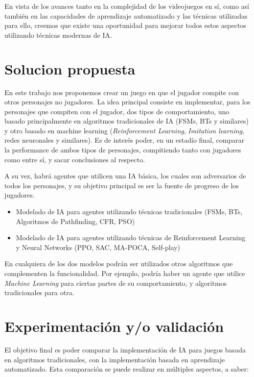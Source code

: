 \documentclass[a4paper]{article}
\begin{document}
En vista de los avances tanto en la complejidad de los videojuegos en sí, como así también en las capacidades de aprendizaje automatizado y las técnicas utilizadas para ello, creemos que existe una oportunidad para mejorar todos estos aspectos utilizando técnicas modernas de IA.

\section{Solucion propuesta}

En este trabajo nos proponemos crear un juego en que el jugador compite con otros personajes no jugadores. La idea principal consiste en implementar, para los personajes que compiten con el jugador, dos tipos de comportamiento, uno basado principalmente en algoritmos tradicionales de IA (FSMs, BTs y similares) y otro basado en machine learning (\textit{Reinforcement Learning}, \textit{Imitation learning}, redes neuronales y similares). Es de interés poder, en un estadío final, comparar la performance de ambos tipos de personajes, compitiendo tanto con jugadores como entre sí, y sacar conclusiones al respecto.

A su vez, habrá agentes que utilicen una IA básica, los cuales son adversarios de todos los personajes, y su objetivo principal es ser la fuente de progreso de los jugadores.

\begin{itemize}
    \item Modelado de IA para agentes utilizando técnicas tradicionales (FSMs, BTs, Algoritmos de Pathfinding, CFR, PSO)
    \item Modelado de IA para agentes utilizando técnicas de Reinforcement Learning y Neural Networks (PPO, SAC, MA-POCA, Self-play)
\end{itemize}

En cualquiera de los dos modelos podrán ser utilizados otros algoritmos que complementen la funcionalidad. Por ejemplo, podría haber un agente que utilice \textit{Machine Learning} para ciertas partes de su comportamiento, y algoritmos tradicionales para otra.

\section{Experimentación y/o validación}

El objetivo final es poder comparar la implementación de IA para juegos basada en algoritmos tradicionales, con la implementación basada en aprendizaje automatizado. Esta comparación se puede realizar en múltiples aspectos, a saber:
\end{document}
